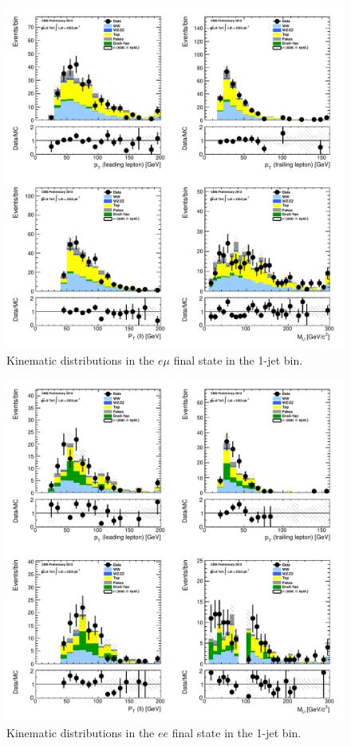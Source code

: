 \begin{figure}[!hbtp]
\centering
\includegraphics[width=1\textwidth]{figures/ww_analysis20_0_ALL_em_1j.pdf} %
\caption{Kinematic distributions in the $e\mu$ final state in the 1-jet bin.}
\label{fig:xs_kinematics_em_1j}
\end{figure}
\begin{figure}[!hbtp]
\centering
\includegraphics[width=1\textwidth]{figures/ww_analysis20_0_ALL_ee_1j.pdf} %
\caption{Kinematic distributions in the $ee$ final state in the 1-jet bin.}
\label{fig:xs_kinematics_ee_1j}
\end{figure}

